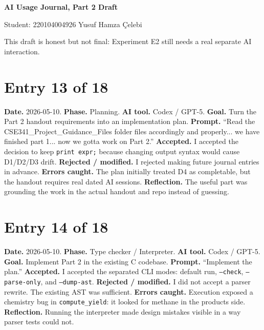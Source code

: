 \documentclass[11pt,a4paper]{article}
\newcommand{\code}[1]{\texttt{#1}}
\begin{document}
\begin{center}
{\huge\bfseries AI Usage Journal, Part 2 Draft\par}
{\large Student: 220104004926 Yusuf Hamza Çelebi\par}
{\footnotesize\color{anscaption}This draft is honest but not final: Experiment E2 still needs a real separate AI interaction.}
\end{center}

\section*{Entry 13 of 18}
\textbf{Date.} 2026-05-10.
\textbf{Phase.} Planning.
\textbf{AI tool.} Codex / GPT-5.
\textbf{Goal.} Turn the Part 2 handout requirements into an implementation plan.
\textbf{Prompt.} ``Read the CSE341\_Project\_Guidance\_Files folder files accordingly and properly... we have finished part 1... now we gotta work on Part 2.''
\textbf{Accepted.} I accepted the decision to keep \code{print expr;} because changing output syntax would cause D1/D2/D3 drift.
\textbf{Rejected / modified.} I rejected making future journal entries in advance.
\textbf{Errors caught.} The plan initially treated D4 as completable, but the handout requires real dated AI sessions.
\textbf{Reflection.} The useful part was grounding the work in the actual handout and repo instead of guessing.

\section*{Entry 14 of 18}
\textbf{Date.} 2026-05-10.
\textbf{Phase.} Type checker / Interpreter.
\textbf{AI tool.} Codex / GPT-5.
\textbf{Goal.} Implement Part 2 in the existing C codebase.
\textbf{Prompt.} ``Implement the plan.''
\textbf{Accepted.} I accepted the separated CLI modes: default run, \code{--check}, \code{--parse-only}, and \code{--dump-ast}.
\textbf{Rejected / modified.} I did not accept a parser rewrite. The existing AST was sufficient.
\textbf{Errors caught.} Execution exposed a chemistry bug in \code{compute\_yield}: it looked for methane in the products side.
\textbf{Reflection.} Running the interpreter made design mistakes visible in a way parser tests could not.
\end{document}
